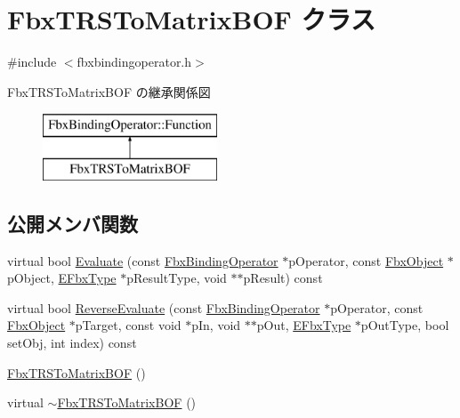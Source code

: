 \hypertarget{class_fbx_t_r_s_to_matrix_b_o_f}{}\section{Fbx\+T\+R\+S\+To\+Matrix\+B\+OF クラス}
\label{class_fbx_t_r_s_to_matrix_b_o_f}


{\ttfamily \#include $<$fbxbindingoperator.\+h$>$}

Fbx\+T\+R\+S\+To\+Matrix\+B\+OF の継承関係図\begin{figure}[H]
\begin{center}
\leavevmode
\includegraphics[height=2.000000cm]{class_fbx_t_r_s_to_matrix_b_o_f}
\end{center}
\end{figure}
\subsection*{公開メンバ関数}
\begin{DoxyCompactItemize}
\item 
virtual bool \hyperlink{class_fbx_t_r_s_to_matrix_b_o_f_a41e6ce21b68dc69b6a71cded68676d1c}{Evaluate} (const \hyperlink{class_fbx_binding_operator}{Fbx\+Binding\+Operator} $\ast$p\+Operator, const \hyperlink{class_fbx_object}{Fbx\+Object} $\ast$p\+Object, \hyperlink{fbxpropertytypes_8h_a73913a5ddfb20e57c6f25e9e6784bd92}{E\+Fbx\+Type} $\ast$p\+Result\+Type, void $\ast$$\ast$p\+Result) const
\item 
virtual bool \hyperlink{class_fbx_t_r_s_to_matrix_b_o_f_a0152c2805f41834ea2554d4d865e308c}{Reverse\+Evaluate} (const \hyperlink{class_fbx_binding_operator}{Fbx\+Binding\+Operator} $\ast$p\+Operator, const \hyperlink{class_fbx_object}{Fbx\+Object} $\ast$p\+Target, const void $\ast$p\+In, void $\ast$$\ast$p\+Out, \hyperlink{fbxpropertytypes_8h_a73913a5ddfb20e57c6f25e9e6784bd92}{E\+Fbx\+Type} $\ast$p\+Out\+Type, bool set\+Obj, int index) const
\item 
\hyperlink{class_fbx_t_r_s_to_matrix_b_o_f_adc9b58f91d49a69d198660387a6cef3b}{Fbx\+T\+R\+S\+To\+Matrix\+B\+OF} ()
\item 
virtual \hyperlink{class_fbx_t_r_s_to_matrix_b_o_f_aff0fa88c1eece14c90373ea53674f4ae}{$\sim$\+Fbx\+T\+R\+S\+To\+Matrix\+B\+OF} ()
\end{DoxyCompactItemize}
